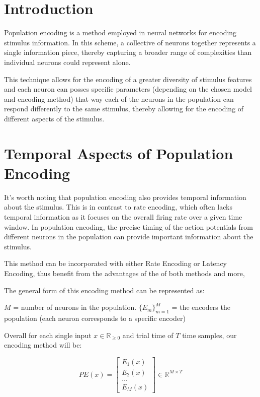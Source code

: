 \section{Introduction}

Population encoding is a method employed in neural networks for encoding stimulus information. In this scheme, a collective of neurons together represents a single information piece, thereby capturing a broader range of complexities than individual neurons could represent alone.

This technique allows for the encoding of a greater diversity of stimulus features and each neuron can posses specific parameters (depending on the chosen model and encoding method) that way each of the neurons in the population can respond differently to the same stimulus, thereby allowing for the encoding of different aspects of the stimulus.

\section{Temporal Aspects of Population Encoding}

It's worth noting that population encoding also provides temporal information about the stimulus. This is in contrast to rate encoding, which often lacks temporal information as it focuses on the overall firing rate over a given time window. In population encoding, the precise timing of the action potentials from different neurons in the population can provide important information about the stimulus.

This method can be incorporated with either Rate Encoding or Latency Encoding, thus benefit from the advantages of the of both methods and more,


The general form of this encoding method can be represented as:

$M$ = number of neurons in the population.
${\{ E_m \} }^M_{m=1}$ = the encoders the population (each neuron corresponds to a specific encoder)

Overall for each single input $x \in \mathbb{R}_{\geq0}$  and trial time of $T$ time samples, our encoding method will be:

\begin{equation}
    PE(x) = 
    \begin{bmatrix} E_{1}(x) \\ E_{2}(x) \\ \dots \\ E_{M}(x) \end{bmatrix} \in \mathbb{R}^{M \times T}
\end{equation}


